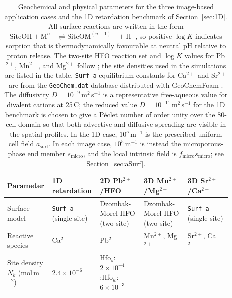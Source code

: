 \begin{table}[htbp]
    \centering
    \caption{Geochemical and physical parameters for the three image-based
    application cases and the 1D retardation benchmark of
    Section~\ref{sec:1D}.
    All surface reactions are written in the form
    $\mathrm{SiteOH} + \mathrm{M}^{n+} \rightleftharpoons \mathrm{SiteOM}^{(n-1)+} + \mathrm{H}^+$,
    so positive $\log K$ indicates sorption that is thermodynamically
    favourable at neutral pH relative to proton release.
    The two-site HFO reaction set and $\log K$ values for Pb$^{2+}$,
    Mn$^{2+}$, and Mg$^{2+}$ follow \citet{dzombak1990surface}; the site
    densities used in the simulations are listed in the table.
    \texttt{Surf\_a} equilibrium constants for Ca$^{2+}$ and
    Sr$^{2+}$ are from the \texttt{GeoChem.dat} database distributed with
    GeoChemFoam \citep{maes2021geochemfoam,parkhurst2013phreeqc}.
    The diffusivity $D = 10^{-9}$\,m$^2$\,s$^{-1}$ is a representative
    free-aqueous value for divalent cations at 25\,\textdegree{}C; the reduced
    value $D = 10^{-11}$\,m$^2$\,s$^{-1}$ for the 1D benchmark is chosen to
    give a P\'{e}clet number of order unity over the 80-cell domain so that
    both advective and diffusive spreading are visible in the spatial profiles.
    In the 1D case, $10^{5}$\,m$^{-1}$ is the prescribed uniform cell field
    $a_{\mathrm{surf}}$. In each image case, $10^{5}$\,m$^{-1}$ is instead the
    microporous-phase end member $s_{\mathrm{micro}}$, and the local intrinsic
    field is $f_{\mathrm{micro}}s_{\mathrm{micro}}$; see
    Section~\ref{sec:aSurf}.}
    \label{tab:chemParams}
    \scriptsize
    \setlength{\tabcolsep}{2pt}
    \begin{tabular}{@{}p{0.13\linewidth}p{0.19\linewidth}p{0.19\linewidth}p{0.19\linewidth}p{0.19\linewidth}@{}}
        \toprule
        Parameter
            & 1D retardation
            & 2D Pb$^{2+}$/HFO
            & 3D Mn$^{2+}$/Mg$^{2+}$
            & 3D Sr$^{2+}$/Ca$^{2+}$ \\
        \midrule
        Surface model
            & \texttt{Surf\_a} (single-site)
            & Dzombak-Morel HFO (two-site)
            & Dzombak-Morel HFO (two-site)
            & \texttt{Surf\_a} (single-site) \\
        Reactive species
            & Ca$^{2+}$
            & Pb$^{2+}$
            & Mn$^{2+}$, Mg$^{2+}$
            & Sr$^{2+}$, Ca$^{2+}$ \\
        Site density $N_k$ (mol\,m$^{-2}$)
            & $2.4\times10^{-6}$
            & Hfo$_s$: $2\times10^{-4}$;\enspace Hfo$_w$: $6\times10^{-3}$

\end{tabular}
\end{table}
